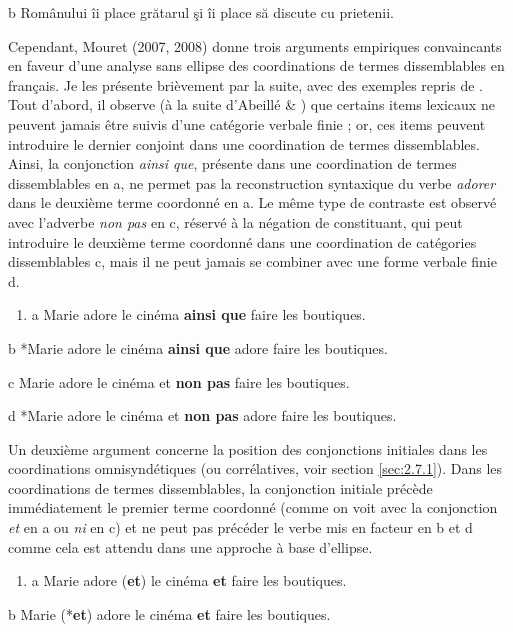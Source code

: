   b  Românului îi place grătarul şi îi place să discute cu prietenii.

Cependant, Mouret (2007, 2008) donne trois arguments empiriques convaincants en faveur d'une analyse sans ellipse des coordinations de termes dissemblables en français. Je les présente brièvement par la suite, avec des exemples repris de \citet{Mouret2008}. Tout d'abord, il observe (à la suite d'Abeillé \& \citet{Godard1996}) que certains items lexicaux ne peuvent jamais être suivis d'une catégorie verbale finie ; or, ces items peuvent introduire le dernier conjoint dans une coordination de termes dissemblables. Ainsi, la conjonction \textit{ainsi que}, présente dans une coordination de termes dissemblables en a, ne permet pas la reconstruction syntaxique du verbe \textit{adorer} dans le deuxième terme coordonné en a. Le même type de contraste est observé avec l'adverbe \textit{non pas} en c, réservé à la négation de constituant, qui peut introduire le deuxième terme coordonné dans une coordination de catégories dissemblables c, mais il ne peut jamais se combiner avec une forme verbale finie d.


\begin{enumerate}
\item \label{bkm:Ref300512867}a  Marie adore le cinéma \textbf{ainsi que} faire les boutiques.


\end{enumerate}
  b  *Marie adore le cinéma \textbf{ainsi que} adore faire les boutiques.

  c  Marie adore le cinéma et \textbf{non pas} faire les boutiques.

  d  *Marie adore le cinéma et \textbf{non pas} adore faire les boutiques.

Un deuxième argument concerne la position des conjonctions initiales dans les coordinations omnisyndétiques (ou corrélatives, voir section \ref{sec:2.7.1}). Dans les coordinations de termes dissemblables, la conjonction initiale précède immédiatement le premier terme coordonné (comme on voit avec la conjonction \textit{et} en a ou \textit{ni} en c) et ne peut pas précéder le verbe mis en facteur en b et d comme cela est attendu dans une approche à base d'ellipse.


\begin{enumerate}
\item \label{bkm:Ref272087433}a  Marie adore (\textbf{et}) le cinéma \textbf{et} faire les boutiques.


\end{enumerate}
  b  Marie (*\textbf{et}) adore le cinéma \textbf{et} faire les boutiques.

